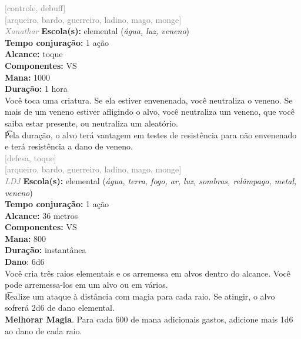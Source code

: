 \documentclass{RPG_Adventure}[2021/10/20]
\begin{document}
{\scriptsize \textcolor{gray}{[controle, debuff]\\}}
{\scriptsize \textcolor{gray}{[arqueiro, bardo, guerreiro, ladino, mago, monge]\\}}
{\tiny \textcolor{gray}{\textit{Xanathar}}}
{\small \t \textbf{Escola(s):} elemental (\textit{água, luz, veneno})\\\t \textbf{Tempo conjuração:} 1 ação\\\t \textbf{Alcance:} toque\\\t \textbf{Componentes:} VS\\\t \textbf{Mana:} 1000\\\t \textbf{Duração:} 1 hora\\}
{\normalsize Você toca uma criatura. Se ela estiver envenenada, você neutraliza o veneno. Se mais de um veneno estiver afligindo o alvo, você neutraliza um veneno, que você saiba estar presente, ou neutraliza um aleatório.\\\t Pela duração, o alvo terá vantagem em testes de resistência para não envenenado e terá resistência a dano de veneno.\\}
{\scriptsize \textcolor{gray}{[defesa, toque]\\}}
{\scriptsize \textcolor{gray}{[arqueiro, bardo, guerreiro, ladino, mago, monge]\\}}
{\tiny \textcolor{gray}{\textit{LDJ}}}
{\small \t \textbf{Escola(s):} elemental (\textit{água, terra, fogo, ar, luz, sombras, relâmpago, metal, veneno})\\\t \textbf{Tempo conjuração:} 1 ação\\\t \textbf{Alcance:} 36 metros\\\t \textbf{Componentes:} VS\\\t \textbf{Mana:} 800\\\t \textbf{Duração:} instantânea\\\t \textbf{Dano}: 6d6\\}
{\normalsize Você cria três raios elementais e os arremessa em alvos dentro do alcance. Você pode arremessa-los em um alvo ou em vários.\\\t Realize um ataque à distância com magia para cada raio. Se atingir, o alvo sofrerá 2d6 de dano elemental.\\\t \textbf{Melhorar Magia}. Para cada 600 de mana adicionais gastos, adicione mais 1d6 ao dano de cada raio.\\}
\end{document}
